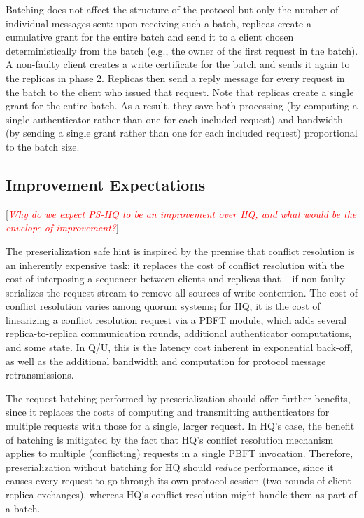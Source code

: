 \documentclass[twocolumn,10pt]{article}
\newcommand{\note}[1]{[\textcolor{red}{\textit{#1}}]}
\begin{document}
Batching does not affect the structure of the protocol but only the
number of individual messages sent: upon receiving such a batch,
replicas create a cumulative grant for the entire batch and send it to a client
chosen deterministically from the batch (e.g., the owner of the first
request in the batch).  A non-faulty client creates a write certificate
for the batch and sends it again to the replicas in phase 2.  Replicas
then send a reply message for every request in the batch to the client
who issued that request.  Note that replicas create a single grant for
the entire batch. As a result, they save both processing (by
computing a single authenticator rather than one for each included
request) and bandwidth (by sending a single grant rather than one for
each included request) proportional to the batch size. 

\subsection{Improvement Expectations}

\note{Why do we expect PS-HQ to be an improvement over HQ, and what would be
the envelope of improvement?}

The preserialization safe hint is inspired by the premise that
conflict resolution is an inherently expensive task; it 
replaces the cost of conflict resolution with the cost of
interposing a sequencer between clients and replicas that -- if
non-faulty -- serializes the request stream to remove all sources of
write contention.  The cost of conflict resolution varies among quorum
systems; for HQ, it is the cost of linearizing a conflict resolution
request via a PBFT module, which adds several replica-to-replica
communication rounds, additional authenticator computations, and some
state.  In Q/U, this is the latency cost inherent in exponential back-off,
as well as the additional bandwidth and computation for protocol message
retransmissions.

The request batching performed by preserialization should offer further
benefits, since it replaces the costs of computing and transmitting
authenticators for multiple requests with those for a single, larger
request.  In HQ's case, the benefit of batching is mitigated by the fact
that HQ's conflict resolution mechanism applies to multiple
(conflicting) requests in a single PBFT invocation.  Therefore,
preserialization without batching for HQ should \emph{reduce}
performance, since it causes every request to go
through its own protocol session (two rounds of client-replica
exchanges), whereas HQ's conflict resolution might handle them as part
of a batch.
\end{document}

